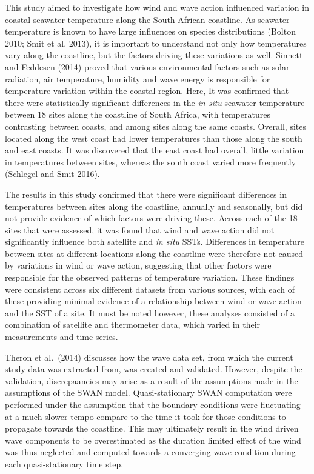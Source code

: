 \documentclass[12pt,a4paper,]{article}
\begin{document}
This study aimed to investigate how wind and wave action influenced
variation in coastal seawater temperature along the South African
coastline. As seawater temperature is known to have large influences on
species distributions (Bolton 2010; Smit et al. 2013), it is important
to understand not only how temperatures vary along the coastline, but
the factors driving these variations as well. Sinnett and Feddesen
(2014) proved that various environmental factors such as solar
radiation, air temperature, humidity and wave energy is responsible for
temperature variation within the coastal region. Here, It was confirmed
that there were statistically significant differences in the \emph{in
situ} seawater temperature between 18 sites along the coastline of South
Africa, with temperatures contrasting between coasts, and among sites
along the same coasts. Overall, sites located along the west coast had
lower temperatures than those along the south and east coasts. It was
discovered that the east coast had overall, little variation in
temperatures between sites, whereas the south coast varied more
frequently (Schlegel and Smit 2016).

The results in this study confirmed that there were significant
differences in temperatures between sites along the coastline, annually
and seasonally, but did not provide evidence of which factors were
driving these. Across each of the 18 sites that were assessed, it was
found that wind and wave action did not significantly influence both
satellite and \emph{in situ} SSTs. Differences in temperature between
sites at different locations along the coastline were therefore not
caused by variations in wind or wave action, suggesting that other
factors were responsible for the observed patterns of temperature
variation. These findings were consistent across six different datasets
from various sources, with each of these providing minimal evidence of a
relationship between wind or wave action and the SST of a site. It must
be noted however, these analyses consisted of a combination of satellite
and thermometer data, which varied in their measurements and time
series.

Theron et al.~(2014) discusses how the wave data set, from which the
current study data was extracted from, was created and validated.
However, despite the validation, discrepaancies may arise as a result of
the assumptions made in the assumptions of the SWAN model.
Quasi-stationary SWAN computation were performed under the assumption
that the boundary conditions were fluctuating at a much slower tempo
compare to the time it took for those conditions to propagate towards
the coastline. This may ultimately result in the wind driven wave
components to be overestimated as the duration limited effect of the
wind was thus neglected and computed towards a converging wave condition
during each quasi-stationary time step.
\end{document}
